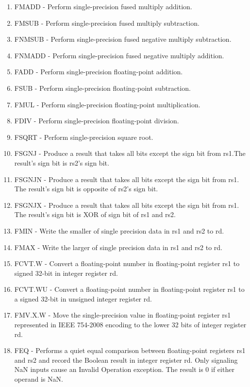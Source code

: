 \documentclass{scrreprt}
\begin{document}
\begin{enumerate}
        \item FMADD - Perform single-precision fused multiply addition. 
        \item FMSUB - Perform single-precision fused multiply subtraction. 
        \item FNMSUB - Perform single-precision fused negative multiply subtraction. 
        \item FNMADD - Perform single-precision fused negative multiply addition. 
        \item FADD -  Perform single-precision floating-point addition.
        \item FSUB - Perform single-precision floating-point subtraction.
        \item FMUL - Perform single-precision floating-point multiplication. 
        \item FDIV - Perform single-precision floating-point division.
        \item FSQRT - Perform single-precision square root.
        \item FSGNJ - Produce a result that takes all bits except the sign bit from rs1.The result’s sign bit is rs2’s sign bit.
        \item FSGNJN - Produce a result that takes all bits except the sign bit from rs1. The result’s sign bit is opposite of rs2’s sign bit.
        \item FSGNJX - Produce a result that takes all bits except the sign bit from rs1. The result’s sign bit is XOR of sign bit of rs1 and rs2.
        \item FMIN - Write the smaller of single precision data in rs1 and rs2 to rd.
        \item FMAX - Write the larger of single precision data in rs1 and rs2 to rd.
        \item FCVT.W - Convert a floating-point number in floating-point register rs1 to signed 32-bit in integer register rd.
        \item FCVT.WU - Convert a floating-point number in floating-point register rs1 to a signed 32-bit in unsigned integer register rd.
        \item FMV.X.W - Move the single-precision value in floating-point register rs1 represented in IEEE 754-2008 encoding to the lower 32 bits of integer register rd.
        \item FEQ - Performs a quiet equal comparison between floating-point registers rs1 and rs2 and record the Boolean result in integer register rd. Only signaling NaN inputs cause an Invalid Operation exception. The result is 0 if either operand is NaN.

\end{enumerate}
\end{document}
